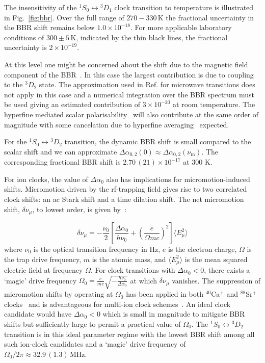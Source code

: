 \documentclass[pra,aps,showpacs,floatfix,twocolumn,nofootinbib,citeautoscript]{revtex4-1}
\newcommand{\fref}[1]{Fig.~\ref{#1}}
\begin{document}
The insensitivity of the $^1S_0\leftrightarrow{^3}D_1$ clock transition to temperature is illustrated in \fref{fig:bbr}.  Over the full range of $270-330\,\mathrm{K}$ the fractional uncertainty in the BBR shift remains below $1.0\times 10^{-18}$.  For more applicable laboratory conditions of $300\pm5\,\mathrm{K}$, indicated by the thin black lines, the fractional uncertainty is $2\times 10^{-19}$.

At this level one might be concerned about the shift due to the magnetic field component of the BBR~\cite{itanoBBR}.  In this case the largest contribution is due to coupling to the $^3D_2$ state.  The approximation used in Ref.\cite{itanoBBR} for microwave transitions does not apply in this case and a numerical integration over the BBR spectrum must be used giving an estimated contribution of $3\times 10^{-20}$ at room temperature. The hyperfine mediated scalar polarisability~\cite{itanoBBR,Dzubahyperfinepol} will also contribute at the same order of magnitude with some cancelation due to hyperfine averaging~\cite{MDB1} expected.

For the $^1S_0\leftrightarrow{^3}D_2$ transition, the dynamic BBR shift is small compared to the scalar shift and we can approximate $\Delta \alpha_{0,2} (0) \approx \Delta \alpha_{0,2} (\nu_\mathrm{m})$. The corresponding fractional BBR shift is $2.70 \,(21) \times10^{-17}$ at 300 K. 

For ion clocks, the value of $\Delta \alpha_{0}$ also has implications for micromotion-induced shifts. Micromotion driven by the rf-trapping field gives rise to two correlated clock shifts: an ac Stark shift and a time dilation shift. The net micromotion shift, $\delta \nu_{\mu}$, to lowest order, is given by~\cite{berkelandMicro,dube2014high}:

\begin{equation}
\label{eq:magicrf}
\delta \nu_{\mu} = -\frac{\nu_0}{2}\left[ \frac{\Delta \alpha_0}{h \nu_0} + \left( \frac{e}{\Omega m c}\right)^2 \right]  \langle E_\mu^2 \rangle
\end{equation}
where $\nu_0$ is the optical transition frequency in Hz, $e$ is the electron charge, $\Omega$ is the trap drive frequency, $m$ is the atomic mass, and  $\langle E_\mu^2 \rangle$ is the mean squared electric field at frequency $\Omega$. For clock transitions with $\Delta \alpha_0<0$, there exists a `magic' drive frequency $\Omega_0 = \frac{e}{ m c} \sqrt{-\frac{h \nu_0}{\Delta\alpha_{0}}}$ at which $\delta \nu_{\mu}$ vanishes. The suppression of micromotion shifts by operating at $\Omega_0$ has been applied in both $^{40}$Ca$^+$ and $^{88}$Sr$^+$ clocks~\cite{cao2017,dube2014high} and is advantageous for multi-ion clock schemes~\cite{MDB2,keller2016evaluation}.  An ideal clock candidate would have $\Delta \alpha_0<0$ which is small in magnitude to mitigate BBR shifts but sufficiently large to permit a practical value of $\Omega_0$.  The $^1S_0\leftrightarrow {^3}D_2$ transition is in this ideal parameter regime with the lowest BBR shift among all such ion-clock candidates and a `magic' drive frequency of $\Omega_0/2\pi \approx 32.9\,(1.3)\,\mathrm{MHz}$.\\ 
\end{document}
